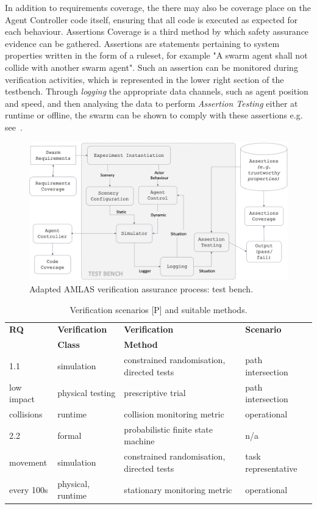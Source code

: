 \documentclass[lettersize,journal]{IEEEtran}
\begin{document}
In addition to requirements coverage, the there may also be coverage place on the Agent Controller code itself, ensuring that all code is executed as expected for each behaviour. Assertions Coverage is a third method by which safety assurance evidence can be gathered. Assertions are statements pertaining to system properties written in the form of a ruleset, for example "A swarm agent shall not collide with another swarm agent". Such an assertion can be monitored during verification activities, which is represented in the lower right section of the testbench. Through \emph{logging} the appropriate data channels, such as agent position and speed, and then analysing the data to perform \emph{Assertion Testing} either at runtime or offline, the swarm can be shown to comply with these assertions e.g. see~\cite{harper2021safety}. \\

\begin{figure}
	\centering
	\includegraphics[width=1.0\textwidth]{figures/verification-testbench.png}
	\caption{Adapted AMLAS verification assurance process: test bench.}
	\label{amlas-a-testbench}
\end{figure}


\begin{table}[t]
\caption{Verification scenarios [P] and suitable methods.}\label{tab:testgen}
\centering
\begin{tabular}{llll}
\textbf{RQ}   & \textbf{Verification}  & \textbf{Verification} & \textbf{Scenario} \\ 
              & \textbf{Class}         & \textbf{Method}		  & 		          \\ 
\hline
1.1 	      & simulation 	   & constrained randomisation, directed tests & path intersection     \\
low impact    & physical testing   & prescriptive trial 				       & path intersection	 \\
collisions    & runtime		   & collision monitoring metric 		       & operational		 \\
\hline
2.2 	      & formal 	 	   & probabilistic finite state machine 	   & n/a      \\
movement      & simulation 	   & constrained randomisation, directed tests & task representative     \\
every 100s    & physical, runtime  & stationary monitoring metric 			   & operational		 \\
\hline
\end{tabular}
\end{table}
\end{document}
